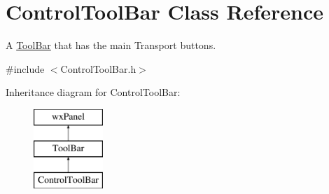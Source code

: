 \hypertarget{class_control_tool_bar}{}\section{Control\+Tool\+Bar Class Reference}
\label{class_control_tool_bar}


A \hyperlink{class_tool_bar}{Tool\+Bar} that has the main Transport buttons.  




{\ttfamily \#include $<$Control\+Tool\+Bar.\+h$>$}

Inheritance diagram for Control\+Tool\+Bar\+:\begin{figure}[H]
\begin{center}
\leavevmode
\includegraphics[height=3.000000cm]{class_control_tool_bar}
\end{center}
\end{figure}
